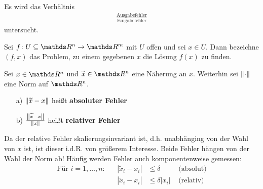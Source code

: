  \label{3.2}
Es wird das Verhältnis 
\begin{gather*}
  \frac{\text{Ausgabefehler}}{\text{Eingabefehler}}
\end{gather*}
untersucht.

\begin{Defe}
  \label{3.2.1} 
  Sei $f\colon U \subseteq \R^n \to \R^m$ mit $U$ offen und sei $x\in U$.
  Dann bezeichne $(f, x)$ das Problem, zu einem gegebenen $x$ die Lösung $f(x)$ zu finden.
\end{Defe}

\begin{Defe}
  \label{3.2.2} 
  Sei $x\in\R^n$ und $\widetilde{x} \in \R^n$ eine Näherung an $x$. Weiterhin sei $\left\| \cdot \right\|$ eine Norm auf $\R^n$.
  \begin{itemize}
  \item[a)] $\left\| \widetilde{x} - x \right\|$ heißt \textbf{absoluter Fehler} 
  \item[b)] $\frac{\left\| \widetilde{x} - x \right\|}{\left\| x \right\|}$ heißt \textbf{relativer Fehler}
  \end{itemize}
  Da der relative Fehler skalierungsinvariant ist, d.h. unabhänging von der  Wahl von $x$ ist, ist dieser i.d.R. von größerem Interesse.
  Beide Fehler hängen von der Wahl der Norm ab!
  Häufig werden Fehler auch komponentenweise gemessen:
  \begin{align*}
    \text{Für } i=1,\ldots , n : && |\widetilde{x}_i - x_i | & \leq \delta & \text{ (absolut)} \\
                                 && |\widetilde{x}_i - x_i | &\leq \delta |x_i| & \text{ (relativ)}
  \end{align*}
\end{Defe}


